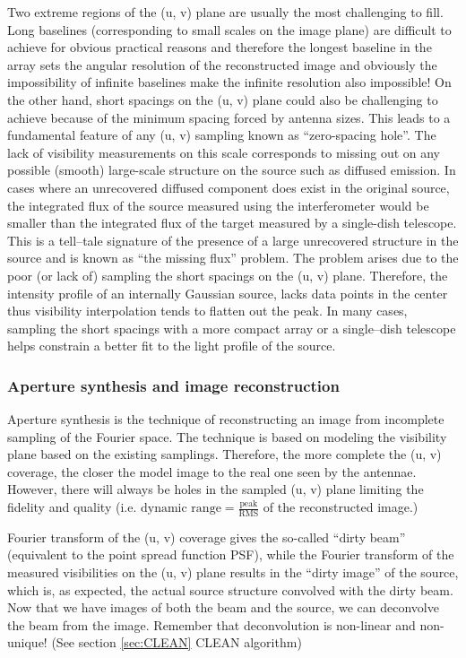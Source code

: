 \documentclass[paper=a4, fontsize=11pt]{scrartcl} %
\numberwithin{equation}{section} %
\numberwithin{figure}{section} %
\numberwithin{table}{section} %
\begin{document}
Two extreme regions of the (u, v) plane are usually the most challenging to fill. Long baselines (corresponding to small scales on the image plane) are difficult to achieve for obvious practical reasons and therefore the longest baseline in the array sets the angular resolution of the reconstructed image and obviously the impossibility of infinite baselines make the infinite resolution also impossible! On the other hand, short spacings on the (u, v) plane could also be challenging to achieve because of the minimum spacing forced by antenna sizes. This leads to a fundamental feature of any (u, v) sampling known as ``zero-spacing hole''. The lack of visibility measurements on this scale corresponds to missing out on any possible (smooth) large-scale structure on the source such as diffused emission. In cases where an unrecovered diffused component does exist in the original source, the integrated flux of the source measured using the interferometer would be smaller than the integrated flux of the target measured by a single-dish telescope. This is a tell--tale signature of the presence of a large unrecovered structure in the source and is known as ``the missing flux'' problem. The problem arises due to the poor (or lack of) sampling the short spacings on the (u, v) plane. Therefore, the intensity profile of an internally Gaussian source, lacks data points in the center thus visibility interpolation tends to flatten out the peak. In many cases, sampling the short spacings with a more compact array or a single--dish telescope helps constrain a better fit to the light profile of the source.

\subsubsection*{Aperture synthesis and image reconstruction}
Aperture synthesis is the technique of reconstructing an image from incomplete sampling of the Fourier space. The technique is based on modeling the visibility plane based on the existing samplings. Therefore, the more complete the (u, v) coverage, the closer the model image to the real one seen by the antennae. However, there will always be holes in the sampled (u, v) plane limiting the fidelity and quality (i.e. $\text{dynamic range} = \frac{\text{peak}}{\text{RMS}}$ of the reconstructed image.)

Fourier transform of the (u, v) coverage gives the so-called ``dirty beam'' (equivalent to the point spread function PSF), while the Fourier transform of the measured visibilities on the (u, v) plane results in the ``dirty image'' of the source, which is, as expected, the actual source structure convolved with the dirty beam. Now that we have images of both the beam and the source, we can deconvolve the beam from the image. Remember that deconvolution is non-linear and non-unique! (See section \ref{sec:CLEAN} CLEAN algorithm)
\end{document}

